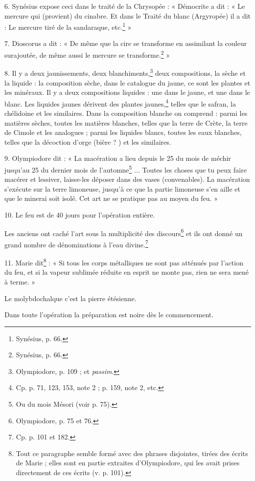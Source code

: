 \documentclass[a4paper, 11pt, oneside, polutonikogreek, french]{article}
\begin{document}
6. Synésius expose ceci dans le traité de la Chrysopée : « Démocrite a dit : « Le mercure qui (provient) du cinabre. Et dans le Traité du blanc (Argyropée) il a dit : Le mercure tiré de la sandaraque, etc.\footnote{Synésius, p. 66.} »

7. Dioscorus a dit : « De même que la cire se transforme en assimilant la couleur surajoutée, de même aussi le mercure se transforme.\footnote{Synésius, p. 66.} »

8. Il y a deux jaunissements, deux blanchiments,\footnote{Olympiodore, p. 109 ; et \emph{passim}.} deux compositions, la sèche et la liquide : la composition sèche, dans le catalogue du jaune, ce sont les plantes et les minéraux. Il y a deux compositions liquides : une dans le jaune, et une dans le blanc. Les liquides jaunes dérivent des plantes jaunes,\footnote{Cp. p. 71, 123, 153, note 2 ; p. 159, note 2, etc.} telles que le safran, la chélidoine et les similaires. Dans la composition blanche on comprend : parmi les matières sèches, toutes les matières blanches, telles que la terre de Crète, la terre de Cimole et les analogues ; parmi les liquides blancs, toutes les eaux blanches, telles que la décoction d'orge (bière ? ) et les similaires.

9. Olympiodore dit : « La macération a lieu depuis le 25 du mois de méchir jusqu'au 25 du dernier mois de l'automne\footnote{Ou du mois Mésori (voir p. 75).} ... Toutes les choses que tu peux faire macérer et lessiver, laisse-les déposer dans des vases (convenables). La macération s'exécute sur la terre limoneuse, jusqu'à ce que la partie limoneuse s'en aille et que le minerai soit isolé. Cet art ne se pratique pas au moyen du feu. »

10. Le feu est de 40 jours pour l'opération entière.

Les anciens ont caché l'art sous la multiplicité des discours\footnote{Olympiodore, p. 75 et 76.} et ils ont donné un grand nombre de dénominations à l'eau divine.\footnote{Cp. p. 101 et 182.}

11. Marie dit\footnote{Tout ce paragraphe semble formé avec des phrases disjointes, tirées des écrits de Marie ; elles sont en partie extraites d'Olympiodore, qui les avait prises directement de ces écrits (v. p. 101).} : « Si tous les corps métalliques ne sont pas atténués par l'action du feu, et si la vapeur sublimée réduite en esprit ne monte pas, rien ne sera mené à terme. »

Le molybdochalque c'est la pierre étésienne.

Dans toute l'opération la préparation est noire dès le commencement.
\end{document}
